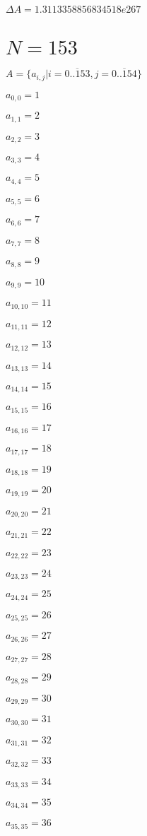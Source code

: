 \documentclass[a4paper,12pt]{article}
\begin{document}
$\Delta A = 1.3113358856834518e267$



\section{ $N = 153$ }
$A = \{ a _{ i, j } | i = \overline { 0..153 }, j = \overline { 0..154 } \}$

$a _{ 0, 0 } = 1$

$a _{ 1, 1 } = 2$

$a _{ 2, 2 } = 3$

$a _{ 3, 3 } = 4$

$a _{ 4, 4 } = 5$

$a _{ 5, 5 } = 6$

$a _{ 6, 6 } = 7$

$a _{ 7, 7 } = 8$

$a _{ 8, 8 } = 9$

$a _{ 9, 9 } = 10$

$a _{ 10, 10 } = 11$

$a _{ 11, 11 } = 12$

$a _{ 12, 12 } = 13$

$a _{ 13, 13 } = 14$

$a _{ 14, 14 } = 15$

$a _{ 15, 15 } = 16$

$a _{ 16, 16 } = 17$

$a _{ 17, 17 } = 18$

$a _{ 18, 18 } = 19$

$a _{ 19, 19 } = 20$

$a _{ 20, 20 } = 21$

$a _{ 21, 21 } = 22$

$a _{ 22, 22 } = 23$

$a _{ 23, 23 } = 24$

$a _{ 24, 24 } = 25$

$a _{ 25, 25 } = 26$

$a _{ 26, 26 } = 27$

$a _{ 27, 27 } = 28$

$a _{ 28, 28 } = 29$

$a _{ 29, 29 } = 30$

$a _{ 30, 30 } = 31$

$a _{ 31, 31 } = 32$

$a _{ 32, 32 } = 33$

$a _{ 33, 33 } = 34$

$a _{ 34, 34 } = 35$

$a _{ 35, 35 } = 36$
\end{document}

